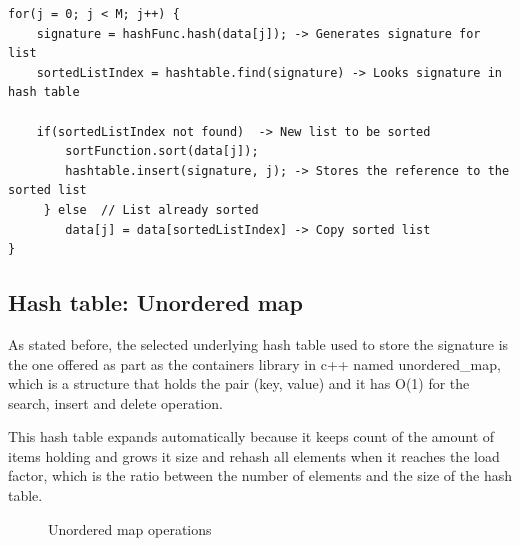 \documentclass[a4paper,12pt]{article}
\begin{document}
\begin{verbatim}
for(j = 0; j < M; j++) {
    signature = hashFunc.hash(data[j]); -> Generates signature for list
    sortedListIndex = hashtable.find(signature) -> Looks signature in hash table
    
    if(sortedListIndex not found)  -> New list to be sorted
        sortFunction.sort(data[j]);
        hashtable.insert(signature, j); -> Stores the reference to the sorted list
     } else  // List already sorted
        data[j] = data[sortedListIndex] -> Copy sorted list
}
\end{verbatim}

\subsection{Hash table: Unordered map} \label{hashTable}
As stated before, the selected underlying hash table used to store the signature is the one offered as part as the containers library in c++ named unordered\_map, which is a structure that holds the pair (key, value) and it has O(1) for the search, insert and delete operation.

This hash table expands automatically because it keeps count of the amount of items holding and grows it size and rehash all elements when it reaches the load factor, which is the ratio between the number of elements and the size of the hash table. 
\begin{figure}[H]
\centering
{}%
\hfill %
%
\caption{Unordered map operations}
\label{fig:hashTableFig}
\end{figure}
\end{document}
